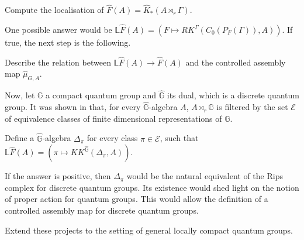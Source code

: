 \begin{Project} Compute the localisation of $\hat F( A) = \hat K_*(A\rtimes_r \Gamma) $.	
\end{Project}

One possible answer would be $\mathbb L \hat F(A) = (F\mapsto RK^\Gamma(C_0(P_F(\Gamma)),A))$. If true, the next step is the following.

\begin{Project} Describe the relation between $\mathbb L \hat F(A)\rightarrow \hat F(A)$ and the controlled assembly map 
$\hat \mu_{G,A}$.	
\end{Project}

Now, let $\mathbb G$ a compact quantum group and $\hat{\mathbb G}$ its dual, which is a discrete quantum group. It was shown in \cite{DellAieraThesis} that, for every $\hat{\mathbb G}$-algebra $A$, $A\rtimes_r \hat{\mathbb G}$ is filtered by the set $\mathcal E$ of equivalence classes of finite dimensional representations of $\mathbb G$.

\begin{Project} Define a 
$ \hat{\mathbb G} $-algebra $\Delta_\pi$ for every class $\pi\in \mathcal E$, such that $\mathbb L \hat F(A) = (\pi\mapsto KK^{\hat{\mathbb G}}(\Delta_\pi,A))$.   
\end{Project}

If the answer is positive, then $\Delta_\pi$ would be the natural equivalent of the Rips complex for discrete quantum groups. Its existence would shed light on the notion of proper action for quantum groups. This would allow the definition of a controlled assembly map for discrete quantum groups.

\begin{Project} Extend these projects to the setting of general locally compact quantum groups.
\end{Project}

	
